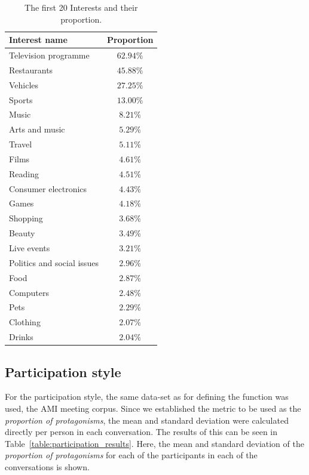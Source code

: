 \begin{table}[H]
    \centering
    \begin{tabular}{lc}
    \hline
    Interest name              & Proportion \\
    \hline
    Television programme       & $62.94\%$    \\
    Restaurants                & $45.88\%$    \\
    Vehicles                   & $27.25\%$    \\
    Sports                     & $13.00\%$    \\
    Music                      & $8.21\%$     \\
    Arts and music             & $5.29\%$     \\
    Travel                     & $5.11\%$     \\
    Films                      & $4.61\%$     \\
    Reading                    & $4.51\%$     \\
    Consumer electronics       & $4.43\%$     \\
    Games                      & $4.18\%$     \\
    Shopping                   & $3.68\%$     \\
    Beauty                     & $3.49\%$     \\
    Live events                & $3.21\%$     \\
    Politics and social issues & $2.96\%$     \\
    Food                       & $2.87\%$     \\
    Computers                  & $2.48\%$     \\
    Pets                       & $2.29\%$     \\
    Clothing                   & $2.07\%$     \\
    Drinks                     & $2.04\%$     \\
    \hline
    \end{tabular}
    \caption{The first 20 Interests and their proportion.}
    \label{table:results_interests}
\end{table}

\subsection{Participation style}

For the participation style, the same data-set as for defining the function was used, the AMI meeting corpus. Since we established the metric to be used as the \textit{proportion of protagonisms}, the mean and standard deviation were calculated directly per person in each conversation. The results of this can be seen in Table~\ref{table:participation_results}. Here, the mean and standard deviation of the \textit{proportion of protagonisms} for each of the participants in each of the conversations is shown.

